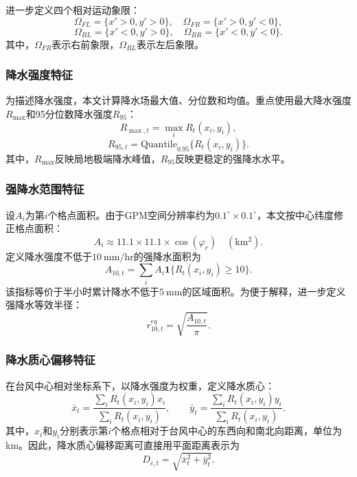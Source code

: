 \documentclass[UTF8,a4paper,zihao=5,fontset=fandol]{ctexart}
\numberwithin{equation}{section}
\numberwithin{figure}{section}
\numberwithin{table}{section}
\begin{document}
进一步定义四个相对运动象限：
\begin{equation}
    \Omega_{FL}=\{x'>0,y'>0\},\quad
    \Omega_{FR}=\{x'>0,y'<0\},
\end{equation}
\begin{equation}
    \Omega_{BL}=\{x'<0,y'>0\},\quad
    \Omega_{BR}=\{x'<0,y'<0\}.
\end{equation}
其中，$\Omega_{FR}$表示右前象限，$\Omega_{BL}$表示左后象限。

\subsubsection{降水强度特征}

为描述降水强度，本文计算降水场最大值、分位数和均值。重点使用最大降水强度$R_{\max}$和95分位数降水强度$R_{95}$：
\begin{equation}
    R_{\max,t}=\max_i R_t(x_i,y_i),
\end{equation}
\begin{equation}
    R_{95,t}=\mathrm{Quantile}_{0.95}\{R_t(x_i,y_i)\}.
\end{equation}
其中，$R_{\max}$反映局地极端降水峰值，$R_{95}$反映更稳定的强降水水平。

\subsubsection{强降水范围特征}

设$A_i$为第$i$个格点面积。由于GPM空间分辨率约为$0.1^\circ\times0.1^\circ$，本文按中心纬度修正格点面积：
\begin{equation}
    A_i \approx 11.1\times 11.1 \times \cos(\varphi_c)\quad(\mathrm{km^2}).
\end{equation}
定义降水强度不低于$10\ \mathrm{mm/hr}$的强降水面积为
\begin{equation}
    A_{10,t}=\sum_i A_i\mathbf{1}\{R_t(x_i,y_i)\geq 10\}.
\end{equation}
该指标等价于半小时累计降水不低于$5\ \mathrm{mm}$的区域面积。为便于解释，进一步定义强降水等效半径：
\begin{equation}
    r_{10,t}^{eq}=\sqrt{\frac{A_{10,t}}{\pi}}.
\end{equation}

\subsubsection{降水质心偏移特征}

在台风中心相对坐标系下，以降水强度为权重，定义降水质心：
\begin{equation}
    \bar{x}_t=\frac{\sum_i R_t(x_i,y_i)x_i}{\sum_i R_t(x_i,y_i)},\qquad
    \bar{y}_t=\frac{\sum_i R_t(x_i,y_i)y_i}{\sum_i R_t(x_i,y_i)}.
\end{equation}
其中，$x_i$和$y_i$分别表示第$i$个格点相对于台风中心的东西向和南北向距离，单位为km。因此，降水质心偏移距离可直接用平面距离表示为
\begin{equation}
    D_{c,t}=\sqrt{\bar{x}_t^2+\bar{y}_t^2}.
\end{equation}
\end{document}

